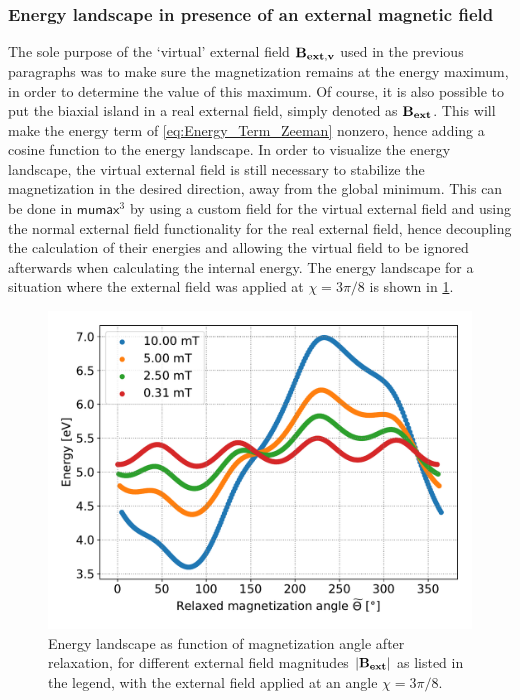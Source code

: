 \documentclass[11pt,a4paper,english]{article}
\newcommand{\mumax}{$\mathsf{mumax}^3$}
\begin{document}
\subsubsection{Energy landscape in presence of an external magnetic field}
The sole purpose of the `virtual' external field $\vb{B_{ext,v}}$ used in the previous paragraphs was to make sure the magnetization remains at the energy maximum, in order to determine the value of this maximum. Of course, it is also possible to put the biaxial island in a real external field, simply denoted as $\vb{B_{ext}}$. This will make the energy term of \cref{eq:Energy_Term_Zeeman} nonzero, hence adding a cosine function to the energy landscape. In order to visualize the energy landscape, the virtual external field is still necessary to stabilize the magnetization in the desired direction, away from the global minimum. This can be done in \mumax{} by using a custom field for the virtual external field and using the normal external field functionality for the real external field, hence decoupling the calculation of their energies and allowing the virtual field to be ignored afterwards when calculating the internal energy. The energy landscape for a situation where the external field was applied at $\chi=3\pi/8$ is shown in \cref{fig:barrierLandscape_extField}.
\begin{figure}
    \centering
    \includegraphics[width=0.9\columnwidth]{Figures/biaxial_island/BarrierLandscape/Ext_K0.1Ms2_Bext1e-2-1e-4_a3Pi8.pdf}
    \caption{Energy landscape as function of magnetization angle after relaxation, for different external field magnitudes $\abs{\vb{B_{ext}}}$ as listed in the legend, with the external field applied at an angle $\chi=3\pi/8$.}
    \label{fig:barrierLandscape_extField}
\end{figure}
\end{document}
